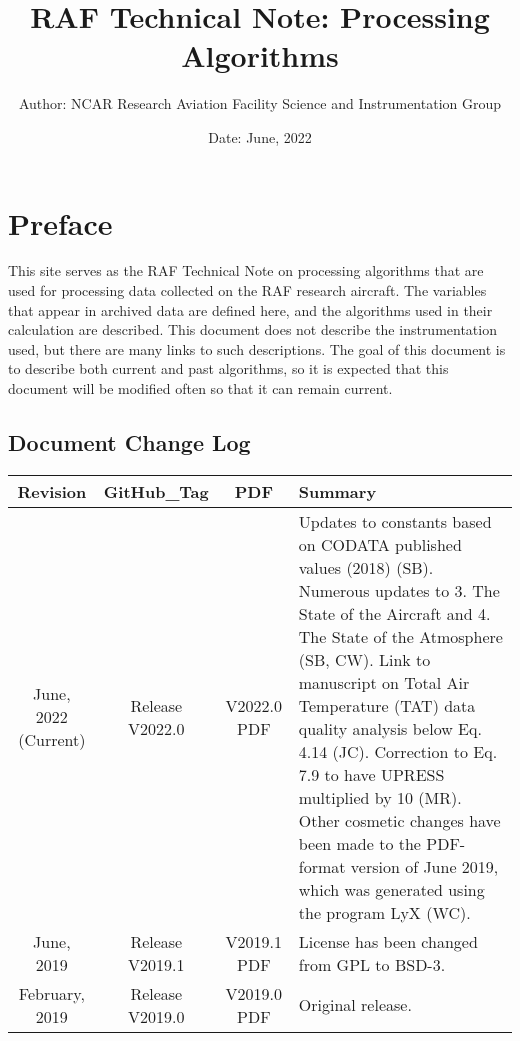 \documentclass[
  english,
]{book}
\title{RAF Technical Note: Processing Algorithms}
\author{Author: NCAR Research Aviation Facility Science and
Instrumentation Group}
\date{Date: June, 2022}
\begin{document}
\frontmatter
\maketitle

{
\setcounter{tocdepth}{1}
\tableofcontents
}
\mainmatter
\hypertarget{index}{%
\chapter*{Preface}\label{index}}

This site serves as the RAF Technical Note on processing algorithms that
are used for processing data collected on the RAF research aircraft. The
variables that appear in archived data are defined here, and the
algorithms used in their calculation are described. This document does
not describe the instrumentation used, but there are many links to such
descriptions. The goal of this document is to describe both current and
past algorithms, so it is expected that this document will be modified
often so that it can remain current.

\hypertarget{document-change-log}{%
\section{Document Change Log}\label{document-change-log}}

\begin{table}
\centering
\begin{tabular}{c|c|c|l}
\hline
Revision & GitHub\_Tag & PDF & Summary\\
\hline
June, 2022 (Current) & Release V2022.0 & V2022.0 PDF & Updates to constants based on CODATA published values (2018) (SB). Numerous updates to 3. The State of the Aircraft and 4. The State of the Atmosphere (SB, CW). Link to manuscript on Total Air Temperature (TAT) data quality analysis below Eq. 4.14 (JC). Correction to Eq. 7.9 to have UPRESS multiplied by 10 (MR). Other cosmetic changes have been made to the PDF-format version of June 2019, which was generated using the program LyX (WC).\\
\hline
June, 2019 & Release V2019.1 & V2019.1 PDF & License has been changed from GPL to BSD-3.\\
\hline
February, 2019 & Release V2019.0 & V2019.0 PDF & Original release.\\
\hline
\end{tabular}
\end{table}
\end{document}
